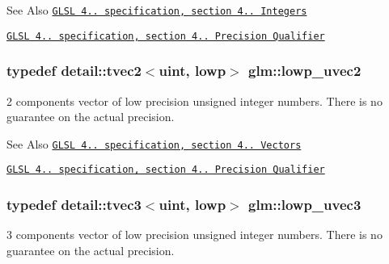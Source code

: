\begin{DoxySeeAlso}{See Also}
\href{http://www.opengl.org/registry/doc/GLSLangSpec.4.20.8.pdf}{\tt G\-L\-S\-L 4.. specification, section 4.. Integers} 

\href{http://www.opengl.org/registry/doc/GLSLangSpec.4.20.8.pdf}{\tt G\-L\-S\-L 4.. specification, section 4.. Precision Qualifier} 
\end{DoxySeeAlso}
\hypertarget{group__core__precision_ga06c64bb528bbecf276ab2d4a2b6c934e}{
\subsubsection[{lowp\-\_\-uvec2}]{\setlength{\rightskip}{0pt plus 5cm}typedef detail\-::tvec2$<$uint, lowp$>$ {\bf glm\-::lowp\-\_\-uvec2}}}\label{group__core__precision_ga06c64bb528bbecf276ab2d4a2b6c934e}
2 components vector of low precision unsigned integer numbers. There is no guarantee on the actual precision.

\begin{DoxySeeAlso}{See Also}
\href{http://www.opengl.org/registry/doc/GLSLangSpec.4.20.8.pdf}{\tt G\-L\-S\-L 4.. specification, section 4.. Vectors} 

\href{http://www.opengl.org/registry/doc/GLSLangSpec.4.20.8.pdf}{\tt G\-L\-S\-L 4.. specification, section 4.. Precision Qualifier} 
\end{DoxySeeAlso}
\hypertarget{group__core__precision_ga26fd88e52fe7003d41b0c57c5edffd6e}{
\subsubsection[{lowp\-\_\-uvec3}]{\setlength{\rightskip}{0pt plus 5cm}typedef detail\-::tvec3$<$uint, lowp$>$ {\bf glm\-::lowp\-\_\-uvec3}}}\label{group__core__precision_ga26fd88e52fe7003d41b0c57c5edffd6e}
3 components vector of low precision unsigned integer numbers. There is no guarantee on the actual precision.

